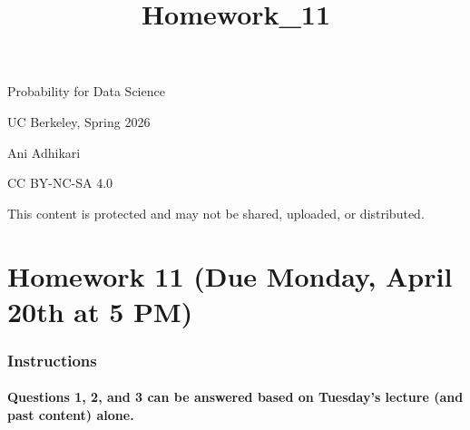 \documentclass[11pt]{article}
\title{Homework\_11}
\begin{document}
    
    \maketitle
    
    

    
    Probability for Data Science

UC Berkeley, Spring 2026

Ani Adhikari

CC BY-NC-SA 4.0

This content is protected and may not be shared, uploaded, or
distributed.

    \hypertarget{homework-11-due-monday-april-20th-at-5-pm}{%
\section{Homework 11 (Due Monday, April 20th at 5
PM)}\label{homework-11-due-monday-april-20th-at-5-pm}}

    \hypertarget{instructions}{%
\subsubsection{Instructions}\label{instructions}}

\hypertarget{questions-1-2-and-3-can-be-answered-based-on-tuesdays-lecture-and-past-content-alone.}{%
\paragraph{\texorpdfstring{\textbf{Questions 1, 2, and 3 can be answered
based on Tuesday's lecture (and past content)
alone.}}{Questions 1, 2, and 3 can be answered based on Tuesday's lecture (and past content) alone.}}\label{questions-1-2-and-3-can-be-answered-based-on-tuesdays-lecture-and-past-content-alone.}}
\end{document}
